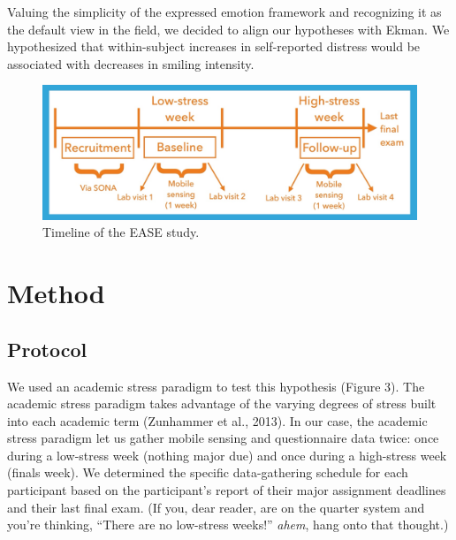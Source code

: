 \documentclass[authordate, empirical,issue]{jote-new-article}
\begin{document}
Valuing the simplicity of the expressed emotion framework and recognizing it as the default view in the field, we decided to align our hypotheses with Ekman. We hypothesized that within-subject increases in self-reported distress would be associated with decreases in smiling intensity.












\begin{figure}[t]
  \begin{fullwidth}
    \includegraphics[width=\linewidth]{media/image3.jpeg}

    \caption{Timeline of the EASE study.}
  \end{fullwidth}

  \label{fig:rId10}


\end{figure}





\section{Method}







\subsection{Protocol}



We used an academic stress paradigm to test this hypothesis (Figure 3). The academic stress paradigm takes advantage of the varying degrees of stress built into each academic term (Zunhammer et al., 2013). In our case, the academic stress paradigm let us gather mobile sensing and questionnaire data twice: once during a low-stress week (nothing major due) and once during a high-stress week (finals week). We determined the specific data-gathering schedule for each participant based on the participant's report of their major assignment deadlines and their last final exam. (If you, dear reader, are on the quarter system and you're thinking, “There are no low-stress weeks!” \emph{ahem}, hang onto that thought.)
\end{document}
